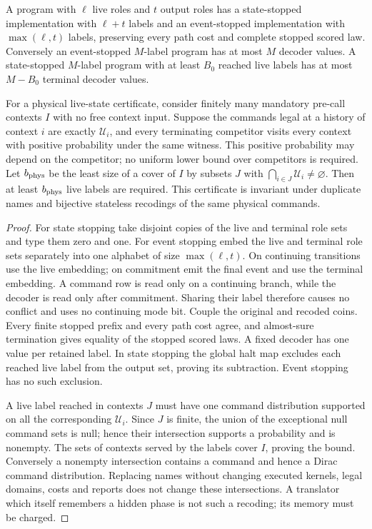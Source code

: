 \begin{lemma}\label{lem:roles}
A program with $\ell$ live roles and $t$ output roles has a state-stopped implementation with $\ell+t$ labels and an event-stopped implementation with $\max(\ell,t)$ labels, preserving every path cost and complete stopped scored law. Conversely an event-stopped $M$-label program has at most $M$ decoder values. A state-stopped $M$-label program with at least $B_0$ reached live labels has at most $M-B_0$ terminal decoder values.

For a physical live-state certificate, consider finitely many mandatory pre-call contexts $I$ with no free context input. Suppose the commands legal at a history of context $i$ are exactly $\mathcal U_i$, and every terminating competitor visits every context with positive probability under the same witness. This positive probability may depend on the competitor; no uniform lower bound over competitors is required. Let $b_{\rm phys}$ be the least size of a cover of $I$ by subsets $J$ with $\bigcap_{i\in J}\mathcal U_i\ne\varnothing$. Then at least $b_{\rm phys}$ live labels are required. This certificate is invariant under duplicate names and bijective stateless recodings of the same physical commands.
\end{lemma}
\begin{proof}
For state stopping take disjoint copies of the live and terminal role sets and type them zero and one. For event stopping embed the live and terminal role sets separately into one alphabet of size $\max(\ell,t)$. On continuing transitions use the live embedding; on commitment emit the final event and use the terminal embedding. A command row is read only on a continuing branch, while the decoder is read only after commitment. Sharing their label therefore causes no conflict and uses no continuing mode bit. Couple the original and recoded coins. Every finite stopped prefix and every path cost agree, and almost-sure termination gives equality of the stopped scored laws. A fixed decoder has one value per retained label. In state stopping the global halt map excludes each reached live label from the output set, proving its subtraction. Event stopping has no such exclusion.

A live label reached in contexts $J$ must have one command distribution supported on all the corresponding $\mathcal U_i$. Since $J$ is finite, the union of the exceptional null command sets is null; hence their intersection supports a probability and is nonempty. The sets of contexts served by the labels cover $I$, proving the bound. Conversely a nonempty intersection contains a command and hence a Dirac command distribution. Replacing names without changing executed kernels, legal domains, costs and reports does not change these intersections. A translator which itself remembers a hidden phase is not such a recoding; its memory must be charged.
\end{proof}

